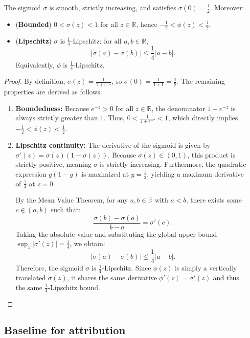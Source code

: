 \documentclass[bdcc,article,submit,pdftex]{Definitions/mdpi}
\newcommand{\R}{\mathbb{R}}
\begin{document}
\begin{Lemma}
\label{lem:sig_props}
The sigmoid $\sigma$ is smooth, strictly increasing, and satisfies $\sigma(0)=\tfrac12$.
Moreover:
\begin{itemize}[leftmargin=1.5em]
    \item (\textbf{Bounded}) $0<\sigma(z)<1$ for all $z\in\R$, hence $-\tfrac12<\phi(z)<\tfrac12$.
    \item (\textbf{Lipschitz}) $\sigma$ is $\tfrac14$-Lipschitz: for all $a,b\in\R$,
    \[
    |\sigma(a)-\sigma(b)| \le \frac14 |a-b|.
    \]
    Equivalently, $\phi$ is $\tfrac14$-Lipschitz.
\end{itemize}
\end{Lemma}

\begin{proof}
By definition, $\sigma(z) = \frac{1}{1+e^{-z}}$, so $\sigma(0) = \frac{1}{1+1} = \frac{1}{2}$. The remaining properties are derived as follows:
\begin{enumerate}[label=(\roman*), leftmargin=1.5em]
    \item \textbf{Boundedness:} Because $e^{-z} > 0$ for all $z \in \R$, the denominator $1+e^{-z}$ is always strictly greater than $1$. Thus, $0 < \frac{1}{1+e^{-z}} < 1$, which directly implies $-\tfrac12 < \phi(z) < \tfrac12$.
    \item \textbf{Lipschitz continuity:} The derivative of the sigmoid is given by $\sigma'(z) = \sigma(z)(1-\sigma(z))$. Because $\sigma(z) \in (0, 1)$, this product is strictly positive, meaning $\sigma$ is strictly increasing. Furthermore, the quadratic expression $y(1-y)$ is maximized at $y = \tfrac12$, yielding a maximum derivative of $\tfrac14$ at $z=0$. 
    
    By the Mean Value Theorem, for any $a, b \in \R$ with $a < b$, there exists some $c \in (a, b)$ such that:
    \[
    \frac{\sigma(b) - \sigma(a)}{b - a} = \sigma'(c).
    \]
    Taking the absolute value and substituting the global upper bound $\sup_z |\sigma'(z)| = \tfrac14$, we obtain:
    \[
    |\sigma(a)-\sigma(b)| \le \frac14 |a-b|.
    \]
    Therefore, the sigmoid $\sigma$ is $\tfrac14$-Lipschitz. Since $\phi(z)$ is simply a vertically translated $\sigma(z)$, it shares the same derivative $\phi'(z) = \sigma'(z)$ and thus the same $\tfrac14$-Lipschitz bound.\qedhere
\end{enumerate}
\end{proof}

\subsection{Baseline for attribution}
\end{document}
